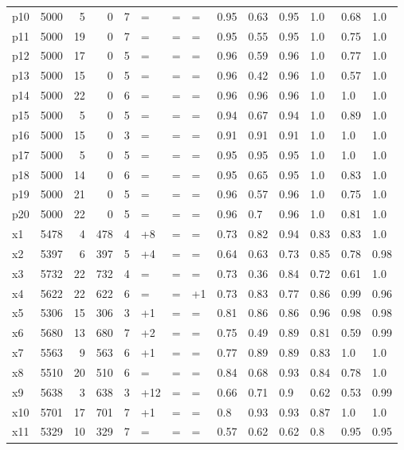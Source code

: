 \begin{tabular}{lrrrllllllllll}
p10 & 5000 & 5 & 0 & 7 & = & = & = & 0.95 & 0.63 & 0.95 & 1.0 & 0.68 & 1.0 \\
p11 & 5000 & 19 & 0 & 7 & = & = & = & 0.95 & 0.55 & 0.95 & 1.0 & 0.75 & 1.0 \\
p12 & 5000 & 17 & 0 & 5 & = & = & = & 0.96 & 0.59 & 0.96 & 1.0 & 0.77 & 1.0 \\
p13 & 5000 & 15 & 0 & 5 & = & = & = & 0.96 & 0.42 & 0.96 & 1.0 & 0.57 & 1.0 \\
p14 & 5000 & 22 & 0 & 6 & = & = & = & 0.96 & 0.96 & 0.96 & 1.0 & 1.0 & 1.0 \\
p15 & 5000 & 5 & 0 & 5 & = & = & = & 0.94 & 0.67 & 0.94 & 1.0 & 0.89 & 1.0 \\
p16 & 5000 & 15 & 0 & 3 & = & = & = & 0.91 & 0.91 & 0.91 & 1.0 & 1.0 & 1.0 \\
p17 & 5000 & 5 & 0 & 5 & = & = & = & 0.95 & 0.95 & 0.95 & 1.0 & 1.0 & 1.0 \\
p18 & 5000 & 14 & 0 & 6 & = & = & = & 0.95 & 0.65 & 0.95 & 1.0 & 0.83 & 1.0 \\
p19 & 5000 & 21 & 0 & 5 & = & = & = & 0.96 & 0.57 & 0.96 & 1.0 & 0.75 & 1.0 \\
p20 & 5000 & 22 & 0 & 5 & = & = & = & 0.96 & 0.7 & 0.96 & 1.0 & 0.81 & 1.0 \\
x1 & 5478 & 4 & 478 & 4 & +8 & = & = & 0.73 & 0.82 & 0.94 & 0.83 & 0.83 & 1.0 \\
x2 & 5397 & 6 & 397 & 5 & +4 & = & = & 0.64 & 0.63 & 0.73 & 0.85 & 0.78 & 0.98 \\
x3 & 5732 & 22 & 732 & 4 & = & = & = & 0.73 & 0.36 & 0.84 & 0.72 & 0.61 & 1.0 \\
x4 & 5622 & 22 & 622 & 6 & = & = & +1 & 0.73 & 0.83 & 0.77 & 0.86 & 0.99 & 0.96 \\
x5 & 5306 & 15 & 306 & 3 & +1 & = & = & 0.81 & 0.86 & 0.86 & 0.96 & 0.98 & 0.98 \\
x6 & 5680 & 13 & 680 & 7 & +2 & = & = & 0.75 & 0.49 & 0.89 & 0.81 & 0.59 & 0.99 \\
x7 & 5563 & 9 & 563 & 6 & +1 & = & = & 0.77 & 0.89 & 0.89 & 0.83 & 1.0 & 1.0 \\
x8 & 5510 & 20 & 510 & 6 & = & = & = & 0.84 & 0.68 & 0.93 & 0.84 & 0.78 & 1.0 \\
x9 & 5638 & 3 & 638 & 3 & +12 & = & = & 0.66 & 0.71 & 0.9 & 0.62 & 0.53 & 0.99 \\
x10 & 5701 & 17 & 701 & 7 & +1 & = & = & 0.8 & 0.93 & 0.93 & 0.87 & 1.0 & 1.0 \\
x11 & 5329 & 10 & 329 & 7 & = & = & = & 0.57 & 0.62 & 0.62 & 0.8 & 0.95 & 0.95 \\

\end{tabular}

